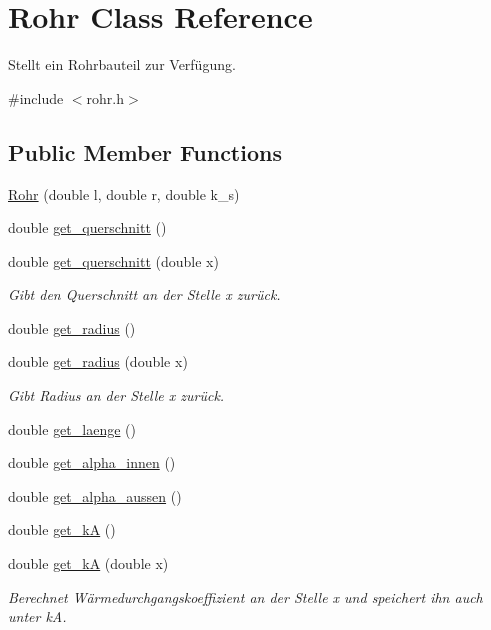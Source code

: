 \hypertarget{class_rohr}{}\section{Rohr Class Reference}
\label{class_rohr}


Stellt ein Rohrbauteil zur Verfügung.  




{\ttfamily \#include $<$rohr.\+h$>$}

\subsection*{Public Member Functions}
\begin{DoxyCompactItemize}
\item 
\hyperlink{class_rohr_afbfc5b0d4a796c1c88b89d88b7b36768}{Rohr} (double l, double r, double k\+\_\+s)
\item 
double \hyperlink{class_rohr_a6763a65cfe3992b6dd4baa903ae44b29}{get\+\_\+querschnitt} ()
\item 
double \hyperlink{class_rohr_ab8c1e474c5b1510a7c52cb805260ab15}{get\+\_\+querschnitt} (double x)
\begin{DoxyCompactList}\small\item\em Gibt den Querschnitt an der Stelle x zurück. \end{DoxyCompactList}\item 
double \hyperlink{class_rohr_a273b05707337661cfaab228a670350f2}{get\+\_\+radius} ()
\item 
double \hyperlink{class_rohr_a427e4ad6d350912715bd6796e385eaf3}{get\+\_\+radius} (double x)
\begin{DoxyCompactList}\small\item\em Gibt Radius an der Stelle x zurück. \end{DoxyCompactList}\item 
double \hyperlink{class_rohr_a191d4b81fcdfc02f9433effdc1fade81}{get\+\_\+laenge} ()
\item 
double \hyperlink{class_rohr_a8e5ea4e3595b344475e2db45deccd9fd}{get\+\_\+alpha\+\_\+innen} ()
\item 
double \hyperlink{class_rohr_ad02b003b17d07ee5f53bc2defbe8227a}{get\+\_\+alpha\+\_\+aussen} ()
\item 
double \hyperlink{class_rohr_a29a212b5ffe5723b3c2fe02aba0804c0}{get\+\_\+kA} ()
\item 
double \hyperlink{class_rohr_a07985e6f4a1d9dc8bfcfe2e5cc9f2a60}{get\+\_\+kA} (double x)
\begin{DoxyCompactList}\small\item\em Berechnet Wärmedurchgangskoeffizient an der Stelle x und speichert ihn auch unter kA. \end{DoxyCompactList}\item 

\end{DoxyCompactItemize}

